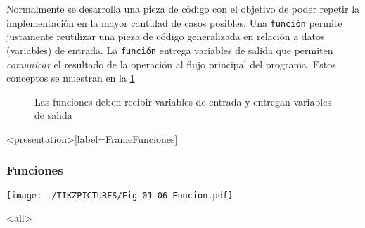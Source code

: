 
Normalmente se desarrolla una pieza de código con el objetivo
de poder repetir la implementación en la mayor cantidad de casos
posibles. Una \texttt{función} permite justamente reutilizar
una pieza de código generalizada en relación a datos (variables) de
entrada. La \texttt{función} entrega variables de salida que permiten
\emph{comunicar} el resultado de la operación al flujo principal
del programa. Estos conceptos se muestran en la \ref{FigFrameFunciones}

\begin{figure}

  \caption{ Las funciones deben recibir variables de entrada
  y entregan variables de salida \label{FigFrameFunciones} }

\end{figure}

\mode*
\begin{frame}<presentation>[label=FrameFunciones]
  \frametitle{Funciones}
    \texttt{[image: ./TIKZPICTURES/Fig-01-06-Funcion.pdf]}

\end{frame}
\mode<all>
